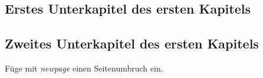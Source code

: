 \subsection{Erstes Unterkapitel des ersten Kapitels}


\subsection{Zweites Unterkapitel des ersten Kapitels}

\lipsum[1]

Füge mit \textit{newpage} einen Seitenumbruch ein.

